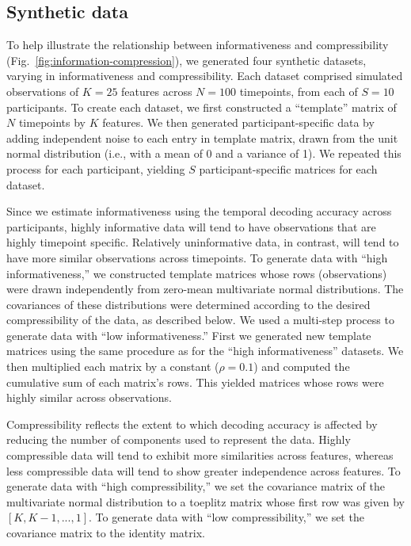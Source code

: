 \documentclass[english, 11pt]{article}
\begin{document}
\subsection*{Synthetic data}

To help illustrate the relationship between informativeness and compressibility
(Fig.~\ref{fig:information-compression}), we generated four synthetic datasets,
varying in informativeness and compressibility. Each dataset comprised
simulated observations of $K = 25$ features across $N = 100$ timepoints, from each of $S = 10$
participants. To create each dataset, we first constructed a ``template''
matrix of $N$ timepoints by $K$ features. We then generated participant-specific
data by adding independent noise to each entry in template matrix, drawn from
the unit normal distribution (i.e., with a mean of 0 and a variance of 1). We
repeated this process for each participant, yielding $S$ participant-specific
matrices for each dataset.

Since we estimate informativeness using the temporal decoding accuracy across
participants, highly informative data will tend to have observations that are
highly timepoint specific. Relatively uninformative data, in contrast, will
tend to have more similar observations across timepoints. To generate data with
``high informativeness,'' we constructed template matrices whose rows
(observations) were drawn independently from zero-mean multivariate normal
distributions. The covariances of these distributions were determined according
to the desired compressibility of the data, as described below. We used a
multi-step process to generate data with ``low informativeness.'' First we
generated new template matrices using the same procedure as for the ``high
informativeness'' datasets. We then multiplied each matrix by a constant ($\rho
= 0.1$) and computed the cumulative sum of each matrix's rows. This yielded
matrices whose rows were highly similar across observations.

Compressibility reflects the extent to which decoding accuracy is affected by
reducing the number of components used to represent the data. Highly
compressible data will tend to exhibit more similarities across features,
whereas less compressible data will tend to show greater independence across
features. To generate data with ``high compressibility,'' we set the covariance
matrix of the multivariate normal distribution to a toeplitz matrix whose first
row was given by $\left[K, K - 1, ..., 1\right]$. To generate data with ``low
compressibility,'' we set the covariance matrix to the identity matrix.
\end{document}
